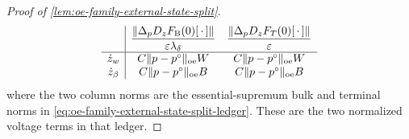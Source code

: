 \begin{proof}[Proof of
\cref{lem:oe-family-external-state-split}]
\begin{equation}
\begin{array}{c|cc}
 &\displaystyle
   \frac{\|\Delta_pD_zF_{\rm B}(0)[\,\cdot\,]\|}
        {\varepsilon\lambda_\delta}
 &\displaystyle
   \frac{\|\Delta_pD_zF_T(0)[\,\cdot\,]\|}
        {\varepsilon}\\[2mm]\hline
 \dot z_w
 &C\|p-p^\circ\|_{\rm oe}W
 &C\|p-p^\circ\|_{\rm oe}W\\
 \dot z_\beta
 &C\|p-p^\circ\|_{\rm oe}B
 &C\|p-p^\circ\|_{\rm oe}B
\end{array}                                      \label{eq:proof-oe-family-mixed-voltage-grid}
\end{equation}
where the two column norms are the essential-supremum bulk and terminal
norms in \cref{eq:oe-family-external-state-split-ledger}.  These are the
two normalized voltage terms in that ledger.


\end{proof}
